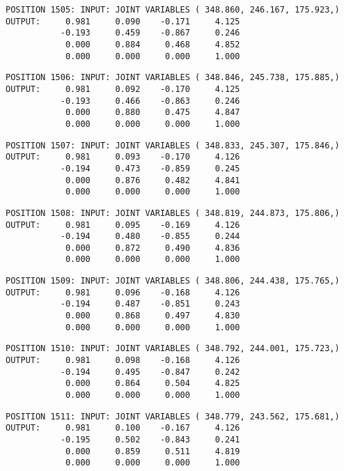 \begin{verbatim}
POSITION 1505: INPUT: JOINT VARIABLES ( 348.860, 246.167, 175.923,)
OUTPUT:     0.981     0.090    -0.171     4.125
           -0.193     0.459    -0.867     0.246
            0.000     0.884     0.468     4.852
            0.000     0.000     0.000     1.000
\end{verbatim} \pagebreak[1]\begin{verbatim}
POSITION 1506: INPUT: JOINT VARIABLES ( 348.846, 245.738, 175.885,)
OUTPUT:     0.981     0.092    -0.170     4.125
           -0.193     0.466    -0.863     0.246
            0.000     0.880     0.475     4.847
            0.000     0.000     0.000     1.000
\end{verbatim} \pagebreak[1]\begin{verbatim}
POSITION 1507: INPUT: JOINT VARIABLES ( 348.833, 245.307, 175.846,)
OUTPUT:     0.981     0.093    -0.170     4.126
           -0.194     0.473    -0.859     0.245
            0.000     0.876     0.482     4.841
            0.000     0.000     0.000     1.000
\end{verbatim} \pagebreak[1]\begin{verbatim}
POSITION 1508: INPUT: JOINT VARIABLES ( 348.819, 244.873, 175.806,)
OUTPUT:     0.981     0.095    -0.169     4.126
           -0.194     0.480    -0.855     0.244
            0.000     0.872     0.490     4.836
            0.000     0.000     0.000     1.000
\end{verbatim} \pagebreak[1]\begin{verbatim}
POSITION 1509: INPUT: JOINT VARIABLES ( 348.806, 244.438, 175.765,)
OUTPUT:     0.981     0.096    -0.168     4.126
           -0.194     0.487    -0.851     0.243
            0.000     0.868     0.497     4.830
            0.000     0.000     0.000     1.000
\end{verbatim} \pagebreak[1]\begin{verbatim}
POSITION 1510: INPUT: JOINT VARIABLES ( 348.792, 244.001, 175.723,)
OUTPUT:     0.981     0.098    -0.168     4.126
           -0.194     0.495    -0.847     0.242
            0.000     0.864     0.504     4.825
            0.000     0.000     0.000     1.000
\end{verbatim} \pagebreak[1]\begin{verbatim}
POSITION 1511: INPUT: JOINT VARIABLES ( 348.779, 243.562, 175.681,)
OUTPUT:     0.981     0.100    -0.167     4.126
           -0.195     0.502    -0.843     0.241
            0.000     0.859     0.511     4.819
            0.000     0.000     0.000     1.000
\end{verbatim} \pagebreak[1]\begin{verbatim}

\end{verbatim}
